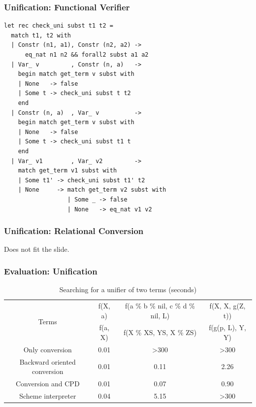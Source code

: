 \documentclass[xcolor=table]{beamer}
\begin{document}
\begin{frame}[fragile]
  \transwipe[direction=90]
  \frametitle{Unification: Functional Verifier}

\begin{lstlisting}[basicstyle=\footnotesize]
let rec check_uni subst t1 t2 =
  match t1, t2 with
  | Constr (n1, a1), Constr (n2, a2) ->
      eq_nat n1 n2 && forall2 subst a1 a2
  | Var_ v         , Constr (n, a)   ->
    begin match get_term v subst with
    | None   -> false
    | Some t -> check_uni subst t t2
    end
  | Constr (n, a)  , Var_ v          ->
    begin match get_term v subst with
    | None   -> false
    | Some t -> check_uni subst t1 t
    end
  | Var_ v1        , Var_ v2         ->
    match get_term v1 subst with
    | Some t1' -> check_uni subst t1' t2
    | None     -> match get_term v2 subst with
                  | Some _ -> false
                  | None   -> eq_nat v1 v2
\end{lstlisting}

\end{frame}
\begin{frame}[fragile]
  \transwipe[direction=90]
  \frametitle{Unification: Relational Conversion}
Does not fit the slide.


\end{frame}


\begin{frame}[fragile]
  \transwipe[direction=90]
  \frametitle{Evaluation: Unification}
\begin{table}
\tiny
\centering
\begin{tabular}{c|c|c|c}
\multirow{ 2}{*}{Terms} &
f(X, a) & f(a \% b \% nil, c \% d \% nil, L) & f(X, X, g(Z, t))  \\
\cline{2-4} &
f(a, X) & f(X \% XS, YS, X \% ZS) & f(g(p, L), Y, Y)  \\
\hline\hline
Only conversion               & 0.01  &  >300 & >300 \\
\hline
Backward oriented conversion  & 0.01  &  0.11 & 2.26  \\
\hline
Conversion and CPD            & 0.01  &  0.07 & 0.90  \\
\hline

Scheme interpreter            & 0.04  & 5.15 & >300   \\
\end{tabular}
 \caption{Searching for a unifier of two terms (seconds)}
    \label{tab:uni}
\end{table}
\end{frame}
\end{document}
